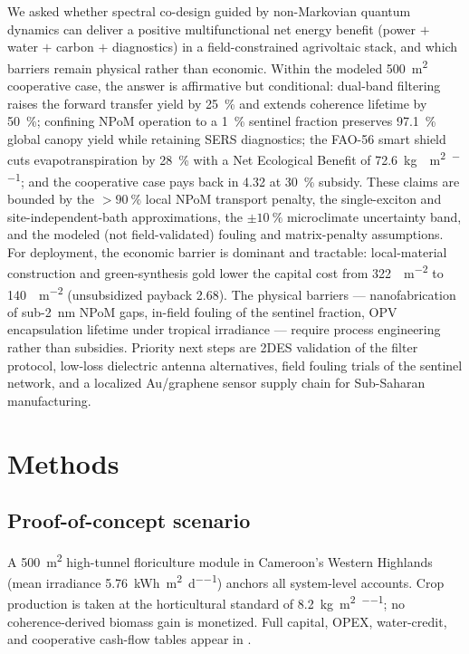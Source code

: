 \documentclass[preprint,12pt]{elsarticle}
\begin{document}
We asked whether spectral co-design guided by non-Markovian quantum dynamics can deliver a positive multifunctional net energy benefit (power $+$ water $+$ carbon $+$ diagnostics) in a field-constrained agrivoltaic stack, and which barriers remain physical rather than economic. Within the modeled \qty{500}{\m\squared} cooperative case, the answer is affirmative but conditional: dual-band filtering raises the forward transfer yield by \qty{25}{\percent} and extends coherence lifetime by \qty{50}{\percent}; confining NPoM operation to a \qty{1}{\percent} sentinel fraction preserves \qty{97.1}{\percent} global canopy yield while retaining SERS diagnostics; the FAO-56 smart shield cuts evapotranspiration by \qty{28}{\percent} with a Net Ecological Benefit of \qty{72.6}{\kg{}\per\m\squared\per\yr}; and the cooperative case pays back in \qty{4.32}{\yr} at \qty{30}{\percent} subsidy. These claims are bounded by the $>\qty{90}{\percent}$ local NPoM transport penalty, the single-exciton and site-independent-bath approximations, the $\pm\qty{10}{\percent}$ microclimate uncertainty band, and the modeled (not field-validated) fouling and matrix-penalty assumptions. For deployment, the economic barrier is dominant and tractable: local-material construction and green-synthesis gold lower the capital cost from \qty{322}{\USD\per\m\squared} to \qty{140}{\USD\per\m\squared} (unsubsidized payback \qty{2.68}{\yr}). The physical barriers --- nanofabrication of sub-\qty{2}{\nano\meter} NPoM gaps, in-field fouling of the sentinel fraction, OPV encapsulation lifetime under tropical irradiance --- require process engineering rather than subsidies. Priority next steps are 2DES validation of the filter protocol, low-loss dielectric antenna alternatives, field fouling trials of the sentinel network, and a localized Au/graphene sensor supply chain for Sub-Saharan manufacturing.


\section{Methods}

\subsection{Proof-of-concept scenario}\label{sec:methods_poc}
A \qty{500}{\m\squared} high-tunnel floriculture module in Cameroon's Western Highlands (mean irradiance \qty{5.76}{\kWh\per\m\squared\per\day}) anchors all system-level accounts. Crop production is taken at the horticultural standard of \qty{8.2}{\kg\per\m\squared\per\yr}; no coherence-derived biomass gain is monetized. Full capital, OPEX, water-credit, and cooperative cash-flow tables appear in .
\end{document}
